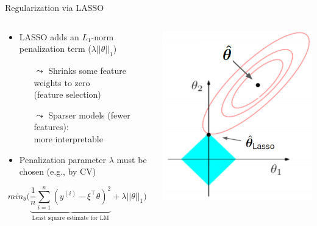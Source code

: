\documentclass[11pt,compress,t,notes=noshow, aspectratio=169, xcolor=table]{beamer}
\begin{document}
\begin{frame}{Regularization via LASSO }
\begin{columns}[T, totalwidth=\linewidth]
\begin{column}{0.6\textwidth}
\begin{itemize}
    \item LASSO adds an $L_1$-norm penalization term ($\lambda||\theta||_1$) %
    \begin{itemize}
        \item[$\leadsto$] Shrinks some feature weights to zero\\ (feature selection)
        \item[$\leadsto$] Sparser models (fewer features): \\ more interpretable
    \end{itemize}
    \item Penalization parameter $\lambda$ must be chosen (e.g., by CV) %
\end{itemize}
\vspace{0.2cm}
$$
min_{\theta} \bigg(\underbrace{\frac{1}{n} \sum_{i=1}^{n} (y^{(i)} - {\xi}^{\top} \theta)^2}_\text{Least square estimate for LM} + \lambda||\theta||_1\bigg) 
$$
\end{column}
\begin{column}{0.4\textwidth}
\centerline{\includegraphics[width=.8\textwidth]{figure/l1_hat.png}} 
\end{column}
\end{columns}

\end{frame}
\end{document}
